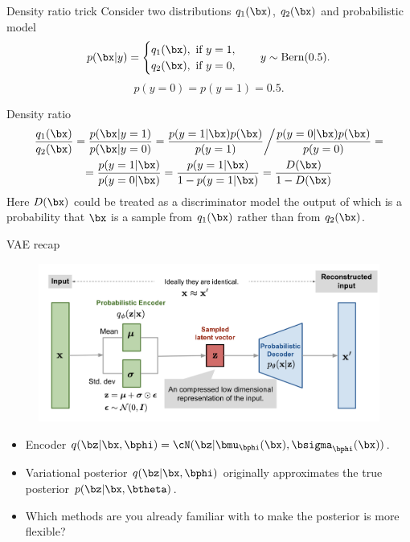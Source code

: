 \begin{frame}{Density ratio trick}
	Consider two distributions $q_1(\bx)$, $q_2(\bx)$ and probabilistic model
	\[
		p(\bx | y) = \begin{cases}
			q_1(\bx), \text{ if } y = 1, \\
			q_2(\bx), \text{ if } y = 0,
		\end{cases}
		\quad 
		y \sim \text{Bern}(0.5).
	\]
	\[
		p(y = 0) = p (y = 1) = 0.5.
	\]
	\begin{block}{Density ratio}
		\vspace{-0.5cm}
		\begin{multline*}
			\frac{q_1(\bx)}{q_2(\bx)} = \frac{p(\bx | y = 1)}{p(\bx | y = 0)} = \frac{p(y = 1 | \bx) p(\bx)}{p(y=1)} \bigg/ \frac{p(y = 0 | \bx) p(\bx)}{p(y=0)} = \\
			= \frac{p(y = 1 | \bx)}{p(y = 0 | \bx)} = \frac{p(y = 1 | \bx)}{1 - p(y = 1 | \bx)} = \frac{D(\bx)}{1 - D(\bx)}
		\end{multline*}
		Here $D(\bx)$ could be treated as a discriminator model the output of which is a probability that $\bx$ is a sample
		from $q_1(\bx)$ rather than from $q_2(\bx)$.
	\end{block}
\end{frame}
\begin{frame}{VAE recap}
	\vspace{-0.3cm}
	\begin{figure}[h]
		\centering
		\includegraphics[width=\linewidth]{figs/vae-gaussian.png}
	\end{figure}
	\vspace{-0.5cm}
	\begin{itemize}
		\item Encoder $q(\bz | \bx, \bphi) = \cN(\bz | \bmu_{\bphi}(\bx), \bsigma_{\bphi}(\bx))$.
		\item Variational posterior $q(\bz | \bx, \bphi)$ originally approximates the true posterior $p(\bz | \bx, \btheta)$.
		\item Which methods are you already familiar with to make the posterior is more flexible?
	\end{itemize}
\end{frame}
